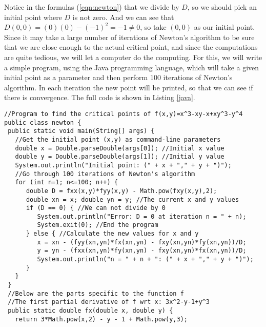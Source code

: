 \begin{exmp}
Notice in the formulas (\ref{eqn:newton}) that we divide by $D$, so we should pick an initial point where $D$ is not
zero. And we can see that $D(0,0) = (0)(0) - (-1)^2 = -1 \ne 0$, so take $(0,0)$ as our initial point. Since it may
take a large number of iterations of Newton's algorithm to be sure that we are close enough to the actual critical
point, and since the computations are quite tedious, we will let a computer do the computing. For this, we will
write a simple program, using the Java programming language, which will take a given initial point as a parameter
and then perform 100 iterations of Newton's algorithm. In each iteration the new point will be printed, so that we
can see if there is convergence. The full code is shown in Listing \ref{java}.
\newpage
{}
\begin{lstlisting}
//Program to find the critical points of f(x,y)=x^3-xy-x+xy^3-y^4
public class newton {
 public static void main(String[] args) {
   //Get the initial point (x,y) as command-line parameters
   double x = Double.parseDouble(args[0]); //Initial x value
   double y = Double.parseDouble(args[1]); //Initial y value
   System.out.println("Initial point: (" + x + "," + y + ")");
   //Go through 100 iterations of Newton's algorithm
   for (int n=1; n<=100; n++) {
      double D = fxx(x,y)*fyy(x,y) - Math.pow(fxy(x,y),2);
      double xn = x; double yn = y; //The current x and y values
      if (D == 0) { //We can not divide by 0
         System.out.println("Error: D = 0 at iteration n = " + n);
         System.exit(0); //End the program
      } else { //Calculate the new values for x and y
         x = xn - (fyy(xn,yn)*fx(xn,yn) - fxy(xn,yn)*fy(xn,yn))/D;
         y = yn - (fxx(xn,yn)*fy(xn,yn) - fxy(xn,yn)*fx(xn,yn))/D;
         System.out.println("n = " + n + ": (" + x + "," + y + ")");
      }
   }
 }
 //Below are the parts specific to the function f
 //The first partial derivative of f wrt x: 3x^2-y-1+y^3
 public static double fx(double x, double y) {
   return 3*Math.pow(x,2) - y - 1 + Math.pow(y,3);

\end{lstlisting}
\end{exmp}
